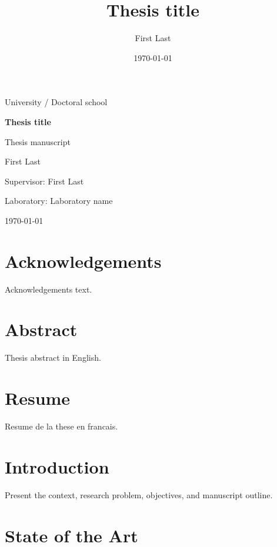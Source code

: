 \documentclass[11pt,a4paper,oneside]{book}
\title{Thesis title}
\author{First Last}
\date{\today}
\begin{document}
\frontmatter


\begin{titlepage}
  \centering
  {\Large University / Doctoral school\par}
  \vspace{2cm}
  {\Huge\bfseries Thesis title\par}
  \vspace{1cm}
  {\Large Thesis manuscript\par}
  \vspace{2cm}
  {\Large First Last\par}
  \vfill
  Supervisor: First Last\par
  Laboratory: Laboratory name\par
  \vspace{1cm}
  {\large \today\par}
\end{titlepage}

\cleardoublepage
{}

\chapter*{Acknowledgements}

Acknowledgements text.

\chapter*{Abstract}

Thesis abstract in English.

\chapter*{Resume}

Resume de la these en francais.

\tableofcontents

\mainmatter

\chapter{Introduction}

Present the context, research problem, objectives, and manuscript outline.

\chapter{State of the Art}
\end{document}

